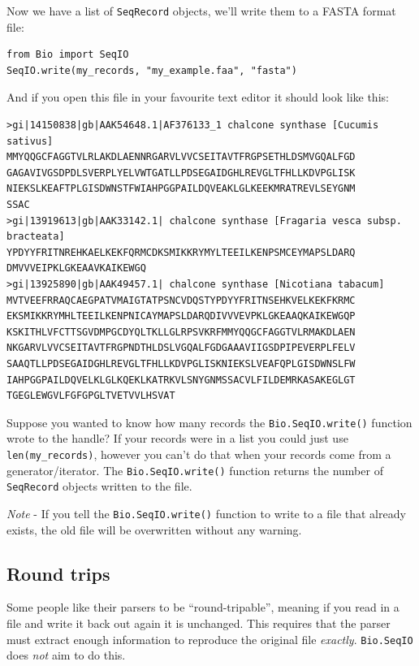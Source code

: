 \documentclass{report}
\begin{document}
\noindent Now we have a list of \verb|SeqRecord| objects, we'll write them to a FASTA format file:

\begin{verbatim}
from Bio import SeqIO
SeqIO.write(my_records, "my_example.faa", "fasta")
\end{verbatim}

\noindent And if you open this file in your favourite text editor it should look like this:

\begin{verbatim}
>gi|14150838|gb|AAK54648.1|AF376133_1 chalcone synthase [Cucumis sativus]
MMYQQGCFAGGTVLRLAKDLAENNRGARVLVVCSEITAVTFRGPSETHLDSMVGQALFGD
GAGAVIVGSDPDLSVERPLYELVWTGATLLPDSEGAIDGHLREVGLTFHLLKDVPGLISK
NIEKSLKEAFTPLGISDWNSTFWIAHPGGPAILDQVEAKLGLKEEKMRATREVLSEYGNM
SSAC
>gi|13919613|gb|AAK33142.1| chalcone synthase [Fragaria vesca subsp. bracteata]
YPDYYFRITNREHKAELKEKFQRMCDKSMIKKRYMYLTEEILKENPSMCEYMAPSLDARQ
DMVVVEIPKLGKEAAVKAIKEWGQ
>gi|13925890|gb|AAK49457.1| chalcone synthase [Nicotiana tabacum]
MVTVEEFRRAQCAEGPATVMAIGTATPSNCVDQSTYPDYYFRITNSEHKVELKEKFKRMC
EKSMIKKRYMHLTEEILKENPNICAYMAPSLDARQDIVVVEVPKLGKEAAQKAIKEWGQP
KSKITHLVFCTTSGVDMPGCDYQLTKLLGLRPSVKRFMMYQQGCFAGGTVLRMAKDLAEN
NKGARVLVVCSEITAVTFRGPNDTHLDSLVGQALFGDGAAAVIIGSDPIPEVERPLFELV
SAAQTLLPDSEGAIDGHLREVGLTFHLLKDVPGLISKNIEKSLVEAFQPLGISDWNSLFW
IAHPGGPAILDQVELKLGLKQEKLKATRKVLSNYGNMSSACVLFILDEMRKASAKEGLGT
TGEGLEWGVLFGFGPGLTVETVVLHSVAT
\end{verbatim}

Suppose you wanted to know how many records the \verb|Bio.SeqIO.write()| function wrote to the handle?
If your records were in a list you could just use \verb|len(my_records)|, however you can't do that when your records come from a generator/iterator.  The \verb|Bio.SeqIO.write()| function returns the number of \verb|SeqRecord| objects written to the file.   

\emph{Note} - If you tell the \verb|Bio.SeqIO.write()| function to write to a file that already exists, the old file will be overwritten without any warning.

\subsection{Round trips}

Some people like their parsers to be ``round-tripable'', meaning if you read in
a file and write it back out again it is unchanged. This requires that the parser
must extract enough information to reproduce the original file \emph{exactly}.
\verb|Bio.SeqIO| does \emph{not} aim to do this.
\end{document}
